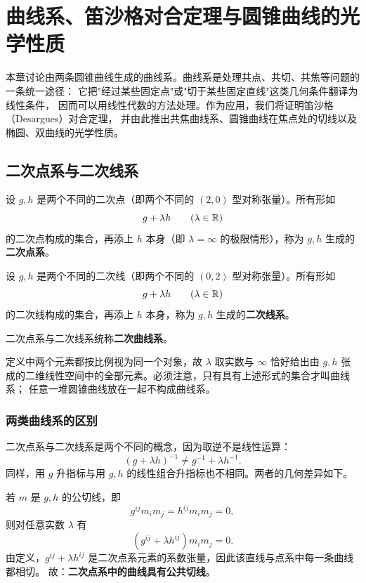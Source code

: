 \chapter{曲线系、笛沙格对合定理与圆锥曲线的光学性质}

本章讨论由两条圆锥曲线生成的曲线系。曲线系是处理共点、共切、共焦等问题的一条统一途径：
它把"经过某些固定点"或"切于某些固定直线"这类几何条件翻译为线性条件，
因而可以用线性代数的方法处理。作为应用，我们将证明笛沙格（Desargues）对合定理，
并由此推出共焦曲线系、圆锥曲线在焦点处的切线以及椭圆、双曲线的光学性质。

\section{二次点系与二次线系}

\begin{definition}[二次点系与二次线系]
设 $g,h$ 是两个不同的二次点（即两个不同的 $(2,0)$ 型对称张量）。所有形如
\[
g+\lambda h\qquad(\lambda\in\mathbb{R})
\]
的二次点构成的集合，再添上 $h$ 本身（即 $\lambda=\infty$ 的极限情形），称为 $g,h$ 生成的
\textbf{二次点系}。

设 $g,h$ 是两个不同的二次线（即两个不同的 $(0,2)$ 型对称张量）。所有形如
\[
g+\lambda h\qquad(\lambda\in\mathbb{R})
\]
的二次线构成的集合，再添上 $h$ 本身，称为 $g,h$ 生成的\textbf{二次线系}。

二次点系与二次线系统称\textbf{二次曲线系}。
\end{definition}

定义中两个元素都按比例视为同一个对象，故 $\lambda$ 取实数与 $\infty$ 恰好给出由 $g,h$
张成的二维线性空间中的全部元素。必须注意，只有具有上述形式的集合才叫曲线系；
任意一堆圆锥曲线放在一起不构成曲线系。

\subsection{两类曲线系的区别}

二次点系与二次线系是两个不同的概念，因为取逆不是线性运算：
\[
(g+\lambda h)^{-1}\neq g^{-1}+\lambda h^{-1}.
\]
同样，用 $g$ 升指标与用 $g,h$ 的线性组合升指标也不相同。两者的几何差异如下。

若 $m$ 是 $g,h$ 的公切线，即
\[
g^{ij}m_im_j=h^{ij}m_im_j=0 ,
\]
则对任意实数 $\lambda$ 有
\[
(g^{ij}+\lambda h^{ij})m_im_j=0 .
\]
由定义，$g^{ij}+\lambda h^{ij}$ 是二次点系元素的系数张量，因此该直线与点系中每一条曲线都相切。
故：\textbf{二次点系中的曲线具有公共切线}。


